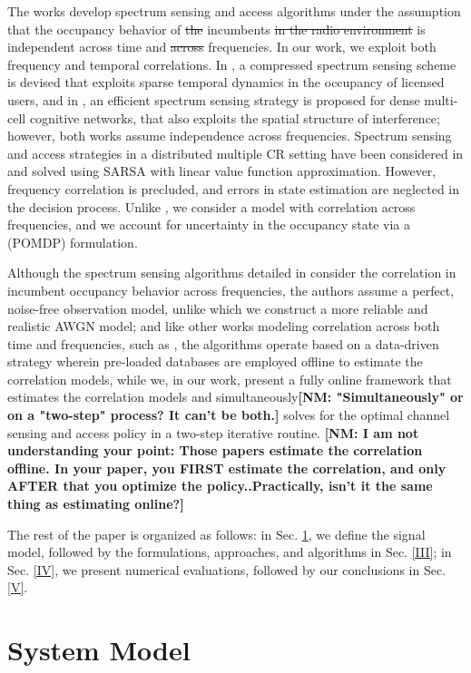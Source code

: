 \documentclass[10pt,twocolumn]{IEEEtran}
\newcommand{\sst}[1]{\st{#1}}
\newcommand{\nm}[1]{{\color{blue}\bf{[NM: #1]}}}
\newcommand{\add}[1]{{\color{red}{#1}}}
\begin{document}
The works \cite{7094730, 7895211} develop spectrum sensing and access algorithms under the assumption that the occupancy behavior of\sst{ the} incumbents\sst{ in the radio environment} is independent across \add{both} time and\sst{ across} frequencies. In our work, we exploit both frequency and temporal correlations. In \cite{7336513}, a compressed spectrum sensing scheme is devised that exploits sparse temporal dynamics in the occupancy of licensed users, and in \cite{8571293}, an efficient spectrum sensing strategy is proposed for dense multi-cell cognitive networks, that also exploits the spatial structure of interference; however, both works assume independence across frequencies. Spectrum sensing and access strategies in a distributed multiple CR setting have been considered in \cite{6507570} and solved using SARSA with linear value function approximation. However, frequency correlation is precluded, and errors in state estimation are neglected in the decision process. Unlike \cite{6507570}, we consider a model with correlation across frequencies, and we account for uncertainty in the occupancy state via a \add{partially observable Markov decision process} (POMDP) formulation. 

Although the spectrum sensing algorithms detailed in \cite{6956794} consider the correlation in incumbent occupancy behavior across frequencies, the authors assume a perfect, noise-free observation model, unlike which we construct a more reliable and realistic AWGN model; and like other works modeling correlation across both time and frequencies, such as \cite{4554696, 7032338}, the algorithms operate based on a  data-driven strategy wherein pre-loaded databases are employed offline to estimate the correlation models, while we, in our work, present a fully online framework that estimates the correlation models and simultaneously\nm{"Simultaneously" or  on a "two-step" process? It can't be both.} solves for the optimal channel sensing and access policy in a two-step iterative routine.
\nm{I am not understanding your point: Those papers estimate the correlation offline. In your paper, you FIRST estimate the correlation, and only AFTER that you optimize the policy..Practically, isn't it the same thing as estimating online?}

The rest of the paper is organized as follows: in Sec. \ref{II}, we define the signal model, followed by the formulations, approaches, and algorithms in Sec. \ref{III}; in Sec. \ref{IV}, we present
numerical evaluations, followed by our conclusions in Sec. \ref{V}.
\section{System Model}\label{II}
\end{document}
